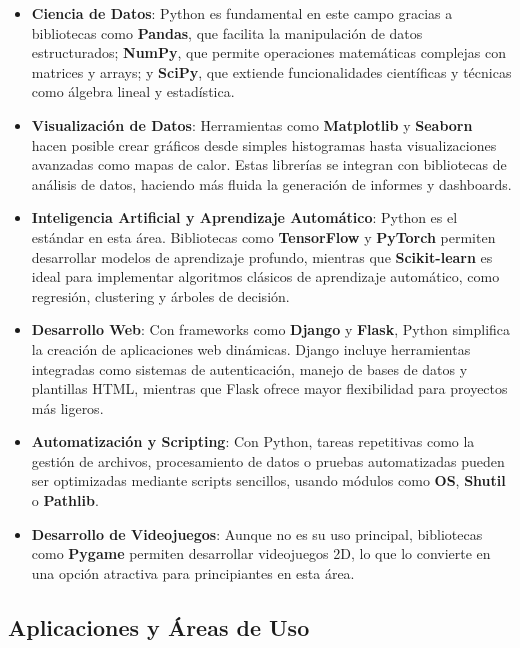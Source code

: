\documentclass[conference]{IEEEtran}
\begin{document}
\begin{itemize}
    \item \textbf{Ciencia de Datos}:  
    Python es fundamental en este campo gracias a bibliotecas como \textbf{Pandas}, que facilita la manipulación de datos estructurados; \textbf{NumPy}, que permite operaciones matemáticas complejas con matrices y arrays; y \textbf{SciPy}, que extiende funcionalidades científicas y técnicas como álgebra lineal y estadística.  

    \item \textbf{Visualización de Datos}:  
    Herramientas como \textbf{Matplotlib} y \textbf{Seaborn} hacen posible crear gráficos desde simples histogramas hasta visualizaciones avanzadas como mapas de calor. Estas librerías se integran con bibliotecas de análisis de datos, haciendo más fluida la generación de informes y dashboards.  

    \item \textbf{Inteligencia Artificial y Aprendizaje Automático}:  
    Python es el estándar en esta área. Bibliotecas como \textbf{TensorFlow} y \textbf{PyTorch} permiten desarrollar modelos de aprendizaje profundo, mientras que \textbf{Scikit-learn} es ideal para implementar algoritmos clásicos de aprendizaje automático, como regresión, clustering y árboles de decisión.  

    \item \textbf{Desarrollo Web}:  
    Con frameworks como \textbf{Django} y \textbf{Flask}, Python simplifica la creación de aplicaciones web dinámicas. Django incluye herramientas integradas como sistemas de autenticación, manejo de bases de datos y plantillas HTML, mientras que Flask ofrece mayor flexibilidad para proyectos más ligeros.  

    \item \textbf{Automatización y Scripting}:  
    Con Python, tareas repetitivas como la gestión de archivos, procesamiento de datos o pruebas automatizadas pueden ser optimizadas mediante scripts sencillos, usando módulos como \textbf{OS}, \textbf{Shutil} o \textbf{Pathlib}.  

    \item \textbf{Desarrollo de Videojuegos}:  
    Aunque no es su uso principal, bibliotecas como \textbf{Pygame} permiten desarrollar videojuegos 2D, lo que lo convierte en una opción atractiva para principiantes en esta área.  
\end{itemize}

\subsection{Aplicaciones y Áreas de Uso}
\end{document}
